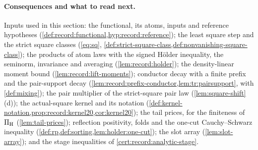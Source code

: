 \paragraph{Consequences and what to read next.}
Inputs used in this section: the functional, its atoms, inputs and
reference hypotheses
(\cref{def:record:functional,hyp:record:reference}); the least square step
and the strict square classes (\eqref{eq:sq}, \cref{def:strict-square-class,def:nonvanishing-square-class});
the products of atom
laws with the signed H\"older inequality, the seminorm, invariance and
averaging (\cref{lem:record:holder}); the density-linear moment bound
(\cref{lem:record:lift-moments}); conductor decay with a finite prefix and
the pair-support decay (\cref{lem:record:prefix-conductor,lem:tr:pairsupport},
with \cref{def:mixing}); the pair multiplier of the strict-square pair law
(\cref{lem:square-shift}(d)); the actual-square kernel and its notation
(\cref{def:kernel-notation,prop:record:kernel20,cor:kernel20}); the tail prices, for the
finiteness of $\Pi_{\rm H}$ (\cref{lem:tail-prices}); reflection
positivity, folds and the one-cut
Cauchy--Schwarz inequality (\cref{def:rp,def:sorting,lem:holder:one-cut}); the
slot array (\cref{lem:slot-array}); and the stage inequalities of
\cref{cert:record:analytic-stage}.
